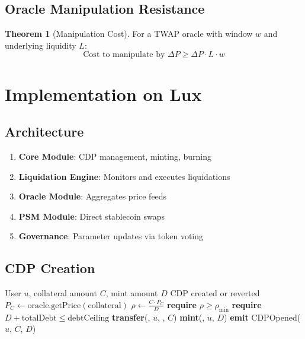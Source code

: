 \documentclass[11pt,a4paper]{article}
\theoremstyle{definition}
\newtheorem{theorem}{Theorem}
\begin{document}
\subsection{Oracle Manipulation Resistance}

\begin{theorem}[Manipulation Cost]
For a TWAP oracle with window $w$ and underlying liquidity $L$:
\begin{equation}
\text{Cost to manipulate by } \Delta P \geq \Delta P \cdot L \cdot w
\end{equation}
\end{theorem}

\section{Implementation on Lux}

\subsection{Architecture}

\begin{enumerate}
\item \textbf{Core Module}: CDP management, minting, burning
\item \textbf{Liquidation Engine}: Monitors and executes liquidations
\item \textbf{Oracle Module}: Aggregates price feeds
\item \textbf{PSM Module}: Direct stablecoin swaps
\item \textbf{Governance}: Parameter updates via token voting
\end{enumerate}

\subsection{CDP Creation}

\begin{algorithm}
\caption{Open CDP}
\begin{algorithmic}[1]
\Require User $u$, collateral amount $C$, mint amount $D$
\Ensure CDP created or reverted
\State $P_C \gets \text{oracle.getPrice}(\text{collateral})$
\State $\rho \gets \frac{C \cdot P_C}{D}$
\State \textbf{require} $\rho \geq \rho_{\min}$
\State \textbf{require} $D + \text{totalDebt} \leq \text{debtCeiling}$
\State \textbf{transfer}(, $u$, , $C$)
\State \textbf{mint}(, $u$, $D$)
\State \textbf{emit} CDPOpened($u$, $C$, $D$)
\end{algorithmic}
\end{algorithm}
\end{document}

